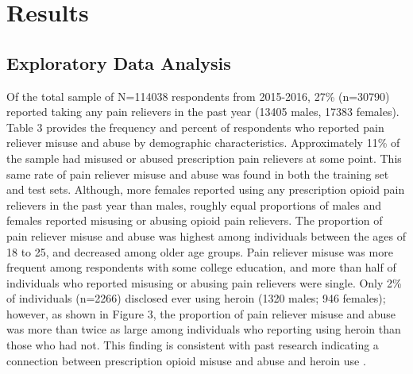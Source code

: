 \documentclass[sigconf]{acmart}
\begin{document}

\section{Results}

\subsection{Exploratory Data Analysis}

Of the total sample of N=114038 respondents from 2015-2016, 27\% (n=30790) 
reported taking any pain relievers in the past year (13405 males, 17383 
females). Table 3 provides the frequency and percent of respondents who 
reported pain reliever misuse and abuse by demographic characteristics. 
Approximately 11\% of the sample had misused or abused prescription pain 
relievers at some point. This same rate of pain reliever misuse and abuse 
was found in both the training set and test sets. Although, more females 
reported using any prescription opioid pain relievers in the past year than 
males, roughly equal proportions of males and females reported misusing or 
abusing opioid pain relievers. The proportion of pain reliever misuse and 
abuse was highest among individuals between the ages of 18 to 25, and 
decreased among older age groups. Pain reliever misuse was more frequent
among respondents with some college education, and more than half of
individuals who reported misusing or abusing pain relievers were single. 
Only 2\% of individuals (n=2266) disclosed ever using heroin (1320 males; 
946 females); however, as shown in Figure 3, the proportion of pain 
reliever misuse and abuse was more than twice as large among individuals
who reporting using heroin than those who had not. This finding is
consistent with past research indicating a connection between prescription
opioid misuse and abuse and heroin use \cite{muhuri13, unick13}.
\end{document}
